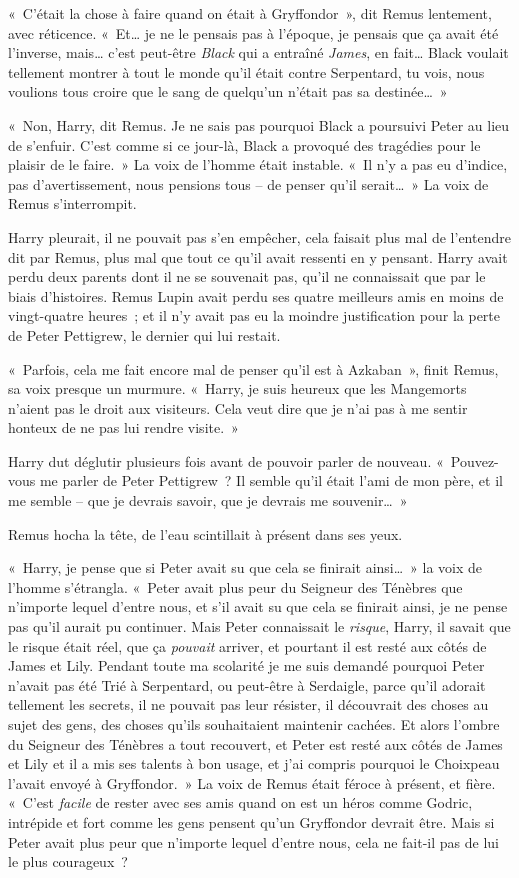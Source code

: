 «~C'était la chose à faire quand on était à Gryffondor~», dit Remus lentement, avec réticence. «~Et… je ne le pensais pas à l'époque, je pensais que ça avait été l'inverse, mais… c'est peut-être \emph{Black} qui a entraîné \emph{James}, en fait… Black voulait tellement montrer à tout le monde qu'il était contre Serpentard, tu vois, nous voulions tous croire que le sang de quelqu'un n'était pas sa destinée…~»

\later

«~Non, Harry, dit Remus. Je ne sais pas pourquoi Black a poursuivi Peter au lieu de s'enfuir. C'est comme si ce jour-là, Black a provoqué des tragédies pour le plaisir de le faire.~» La voix de l'homme était instable. «~Il n'y a pas eu d'indice, pas d'avertissement, nous pensions tous -- de penser qu'il serait…~» La voix de Remus s'interrompit.

Harry pleurait, il ne pouvait pas s'en empêcher, cela faisait plus mal de l'entendre dit par Remus, plus mal que tout ce qu'il avait ressenti en y pensant. Harry avait perdu deux parents dont il ne se souvenait pas, qu'il ne connaissait que par le biais d'histoires. Remus Lupin avait perdu ses quatre meilleurs amis en moins de vingt-quatre heures~; et il n'y avait pas eu la moindre justification pour la perte de Peter Pettigrew, le dernier qui lui restait.

«~Parfois, cela me fait encore mal de penser qu'il est à Azkaban~», finit Remus, sa voix presque un murmure. «~Harry, je suis heureux que les Mangemorts n'aient pas le droit aux visiteurs. Cela veut dire que je n'ai pas à me sentir honteux de ne pas lui rendre visite.~»

Harry dut déglutir plusieurs fois avant de pouvoir parler de nouveau. «~Pouvez-vous me parler de Peter Pettigrew~? Il semble qu'il était l'ami de mon père, et il me semble -- que je devrais savoir, que je devrais me souvenir…~»

Remus hocha la tête, de l'eau scintillait à présent dans ses yeux.

«~Harry, je pense que si Peter avait su que cela se finirait ainsi…~» la voix de l'homme s'étrangla. «~Peter avait plus peur du Seigneur des Ténèbres que n'importe lequel d'entre nous, et s'il avait su que cela se finirait ainsi, je ne pense pas qu'il aurait pu continuer. Mais Peter connaissait le \emph{risque}, Harry, il savait que le risque était réel, que ça \emph{pouvait} arriver, et pourtant il est resté aux côtés de James et Lily. Pendant toute ma scolarité je me suis demandé pourquoi Peter n'avait pas été Trié à Serpentard, ou peut-être à Serdaigle, parce qu'il adorait tellement les secrets, il ne pouvait pas leur résister, il découvrait des choses au sujet des gens, des choses qu'ils souhaitaient maintenir cachées. Et alors l'ombre du Seigneur des Ténèbres a tout recouvert, et Peter est resté aux côtés de James et Lily et il a mis ses talents à bon usage, et j'ai compris pourquoi le Choixpeau l'avait envoyé à Gryffondor.~» La voix de Remus était féroce à présent, et fière. «~C'est \emph{facile} de rester avec ses amis quand on est un héros comme Godric, intrépide et fort comme les gens pensent qu'un Gryffondor devrait être. Mais si Peter avait plus peur que n'importe lequel d'entre nous, cela ne fait-il pas de lui le plus courageux~?

